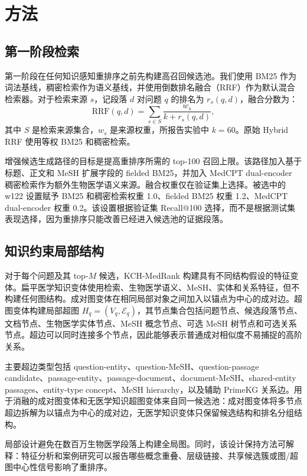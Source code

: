 \section{方法}



\subsection{第一阶段检索}

第一阶段在任何知识感知重排序之前先构建高召回候选池。我们使用 BM25 作为词法基线，稠密检索作为语义基线，并使用倒数排名融合（RRF）作为默认混合检索器。对于检索来源 $s$，记段落 $d$ 对问题 $q$ 的排名为 $r_s(q,d)$，融合分数为：
\[
  \mathrm{RRF}(q,d)=\sum_{s \in S}\frac{w_s}{k+r_s(q,d)},
\]
其中 $S$ 是检索来源集合，$w_s$ 是来源权重，所报告实验中 $k=60$。原始 Hybrid RRF 使用等权 BM25 和稠密检索。

增强候选生成路径的目标是提高重排序所需的 top-100 召回上限。该路径加入基于标题、正文和 MeSH 扩展字段的 fielded BM25，并加入 MedCPT dual-encoder 稠密检索作为额外生物医学语义来源。融合权重仅在验证集上选择。被选中的 w122 设置赋予 BM25 和稠密检索权重 1.0、fielded BM25 权重 1.2、MedCPT dual-encoder 权重 0.2。该设置根据验证集 Recall@100 选择，而不是根据测试集表现选择，因为重排序只能改善已经进入候选池的证据段落。

\subsection{知识约束局部结构}

对于每个问题及其 top-$M$ 候选，KCH-MedRank 构建具有不同结构假设的特征变体。扁平医学知识变体使用检索、生物医学语义、MeSH、实体和关系特征，但不构建任何图结构。成对图变体在相同局部对象之间加入以锚点为中心的成对边。超图变体构建局部超图 $H_q=(V_q,\mathcal{E}_q)$，其节点集合包括问题节点、候选段落节点、文档节点、生物医学实体节点、MeSH 概念节点、可选 MeSH 树节点和可选关系节点。超边可以同时连接多个节点，因此能够表示普通成对相似度不易捕捉的高阶关系。

主要超边类型包括 question-entity、question-MeSH、question-passage candidate、passage-entity、passage-document、document-MeSH、shared-entity passages、entity-type concept、MeSH hierarchy，以及辅助 PrimeKG 关系边。用于消融的成对图变体和无医学知识超图变体来自同一候选池：成对图变体将多节点超边拆解为以锚点为中心的成对边，无医学知识变体只保留候选结构和排名分组结构。

局部设计避免在数百万生物医学段落上构建全局图。同时，该设计保持方法可解释：特征分析和案例研究可以报告哪些概念重叠、层级链接、共享候选簇或图/超图中心性信号影响了重排序。

